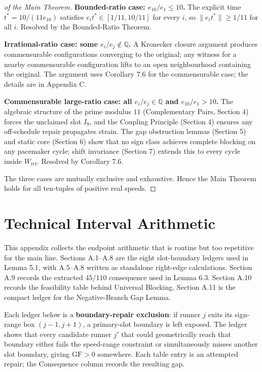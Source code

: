 \documentclass[12pt]{article}
\begin{document}
\begin{proof}[of the Main Theorem]

\textbf{Bounded-ratio case: $e_{10}/e_1\le 10$.}
The explicit time $t^*=10/(11e_{10})$ satisfies $e_it^*\in[1/11,10/11]$ for every $i$,
so $\|e_it^*\|\ge 1/11$ for all $i$. Resolved by the Bounded-Ratio Theorem.

\textbf{Irrational-ratio case: some $e_i/e_j\notin\mathbb{Q}$.}
A Kronecker closure argument produces commensurable configurations converging to the
original; any witness for a nearby commensurable configuration lifts to an open
neighbourhood containing the original. The argument uses Corollary 7.6 for the
commensurable case; the details are in Appendix C.

\textbf{Commensurable large-ratio case: all $e_i/e_j\in\mathbb{Q}$ and $e_{10}/e_1>10$.}
The algebraic structure of the prime modulus $11$ (Complementary Pairs, Section 4) forces
the unclaimed slot $I_9$, and the Coupling Principle (Section 4) ensures any off-schedule
repair propagates strain. The gap obstruction lemmas (Section 5) and static core (Section 6)
show that no sign class achieves complete blocking on any pacemaker cycle; shift invariance
(Section 7) extends this to every cycle inside $W_{\mathrm{ref}}$. Resolved by Corollary 7.6.

The three cases are mutually exclusive and exhaustive. Hence the Main Theorem holds for
all ten-tuples of positive real speeds.
\end{proof}






\appendix
\section{Technical Interval Arithmetic}

This appendix collects the endpoint arithmetic that is routine but too repetitive for the
main line. Sections A.1–A.8 are the eight slot-boundary ledgers used in Lemma 5.1, with
A.5–A.8 written as standalone right-edge calculations. Section A.9 records the extracted
$45/110$ consequence used in Lemma 6.3. Section A.10 records the feasibility table behind
Universal Blocking. Section A.11 is the compact ledger for the Negative-Branch Gap Lemma.

Each ledger below is a \textbf{boundary-repair exclusion}: if runner $j$ exits its sign-range
box $(j-1,j+1)$, a primary-slot boundary is left exposed. The ledger shows that every
candidate runner $j'$ that could geometrically reach that boundary either fails the
speed-range constraint or simultaneously misses another slot boundary, giving
$\mathrm{GF}>0$ somewhere. Each table entry is an attempted repair; the Consequence column
records the resulting gap.
\end{document}
